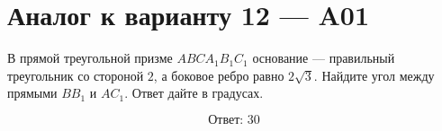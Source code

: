 \documentclass[12pt,a4paper]{article}
\begin{document}
\section*{Аналог к варианту 12 — A01}

В прямой треугольной призме \(ABCA_1B_1C_1\) основание — правильный треугольник со стороной \(2\), а боковое ребро равно \(2\sqrt3\). Найдите угол между прямыми \(BB_1\) и \(AC_1\). Ответ дайте в градусах.

\begin{center}
\end{center}

\[
\boxed{\text{Ответ: }30}
\]
\end{document}
